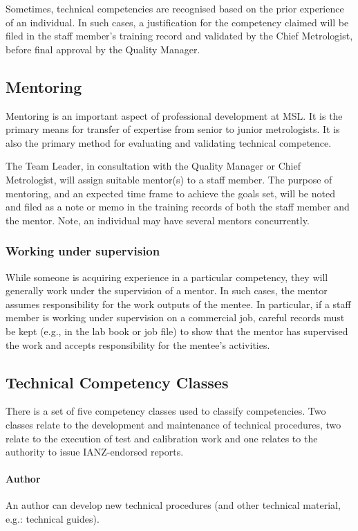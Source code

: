 Sometimes, technical competencies are recognised based on the prior experience of an individual. In such cases, a justification for the competency claimed will be filed in the staff member's training record and validated by the Chief Metrologist, before final approval by the Quality Manager. 

\subsection{Mentoring}
\label{ss:mentoring}
Mentoring is an important aspect of professional development at MSL. It is the primary means for transfer of expertise from senior to junior metrologists. It is also the primary method for evaluating and validating technical competence.

The Team Leader, in consultation with the Quality Manager or Chief Metrologist, will assign suitable mentor(s) to a staff member. The purpose of mentoring, and an expected time frame to achieve the goals set, will be noted and filed as a note or memo in the training records of both the staff member and the mentor. Note, an individual may have several mentors concurrently.

\subsubsection{Working under supervision}
While someone is acquiring experience in a particular competency, they will generally work under the supervision of a mentor. In such cases, the mentor assumes responsibility for the work outputs of the mentee. In particular, if a staff member is working under supervision on a commercial job, careful records must be kept (e.g., in the lab book or job file) to show that the mentor has supervised the work and accepts responsibility for the mentee's activities.

\subsection{Technical Competency Classes}
There is a set of five competency classes used to classify competencies. Two classes relate to the development and maintenance of technical procedures, two relate to the execution of test and calibration work and one relates to the authority to issue IANZ-endorsed reports. 

\paragraph{Author}
An author can develop new technical procedures (and other technical material, e.g.: technical guides).

